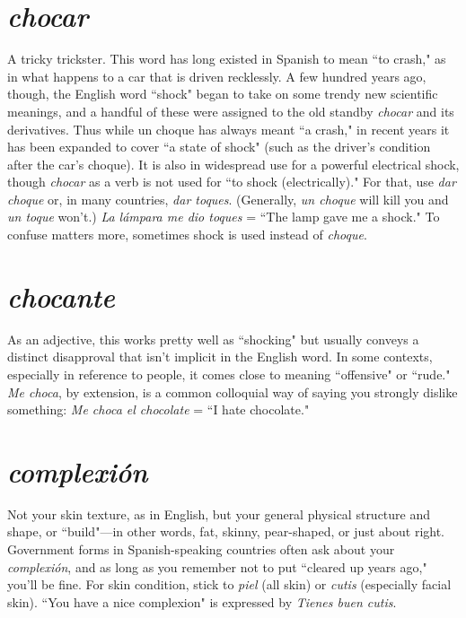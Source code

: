 \section{\emph{chocar}}

A tricky trickster. This word has long existed in
Spanish to mean ``to crash," as in what happens to a car that is driven
recklessly. A few hundred years ago, though, the English word ``shock"
began to take on some trendy new scientific meanings, and a handful
of these were assigned to the old standby \emph{chocar} and its derivatives.
Thus while un choque has always meant ``a crash," in recent years it
has been expanded to cover ``a state of shock" (such as the driver's condition after the car's choque). It is also in widespread use for a powerful electrical shock, though \emph{chocar} as a verb is not used for ``to shock
(electrically)." For that, use \emph{dar choque} or, in many countries, \emph{dar toques}. (Generally, \emph{un choque} will kill you and \emph{un toque} won't.) \emph{La lámpara me dio toques} = ``The lamp gave me a shock." To confuse matters more, sometimes shock is used instead of \emph{choque}.

\section{\emph{chocante}}

As an adjective, this works pretty well as
``shocking" but usually conveys a distinct disapproval that isn't implicit in the English word. In some contexts, especially in reference to
people, it comes close to meaning ``offensive" or ``rude." \emph{Me choca}, by
extension, is a common colloquial way of saying you strongly dislike
something: \emph{Me choca el chocolate} = ``I hate chocolate."

\section{\emph{complexión}}

Not your skin texture, as in English, but your
general physical structure and shape, or ``build"---in other words, fat,
skinny, pear-shaped, or just about right. Government forms in Spanish-speaking countries often ask about your \emph{complexión}, and as long as
you remember not to put ``cleared up years ago," you'll be fine. For
skin condition, stick to \emph{piel} (all skin) or \emph{cutis} (especially facial skin).
``You have a nice complexion" is expressed by \emph{Tienes buen cutis}.

